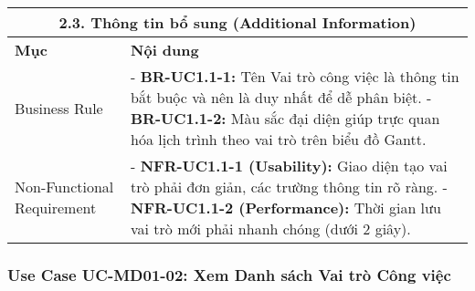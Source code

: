 \begin{longtable}{|m{4cm}|p{11cm}|}
\hline
\multicolumn{2}{|c|}{\textbf{2.3. Thông tin bổ sung (Additional Information)}} \\
\hline
\textbf{Mục} & \textbf{Nội dung} \\
\hline
Business Rule & - \textbf{BR-UC1.1-1:} Tên Vai trò công việc là thông tin bắt buộc và nên là duy nhất để dễ phân biệt. \newline - \textbf{BR-UC1.1-2:} Màu sắc đại diện giúp trực quan hóa lịch trình theo vai trò trên biểu đồ Gantt. \\
\hline
Non-Functional Requirement & - \textbf{NFR-UC1.1-1 (Usability):} Giao diện tạo vai trò phải đơn giản, các trường thông tin rõ ràng. \newline - \textbf{NFR-UC1.1-2 (Performance):} Thời gian lưu vai trò mới phải nhanh chóng (dưới 2 giây). \\
\hline
\end{longtable}

\subsubsection{Use Case UC-MD01-02: Xem Danh sách Vai trò Công việc}

